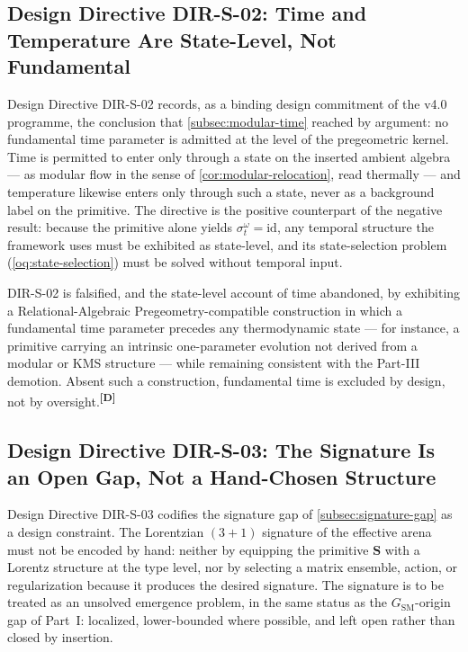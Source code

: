 \documentclass[12pt,a4paper,twoside]{article}
\theoremstyle{plain}
\theoremstyle{definition}
\theoremstyle{remark}
\newcommand{\ProjectShort}{Relational-Algebraic Pregeometry}
\newcommand{\RAP}{\ProjectShort}
\newcommand{\catmark}[1]{\textsuperscript{\textsf{\textbf{[#1]}}}}
\begin{document}
\subsection{Design Directive DIR-S-02: Time and Temperature Are State-Level, Not Fundamental}
\label{subsec:dir-s-02}

Design Directive DIR-S-02 records, as a binding design commitment of the
v4.0 programme, the conclusion that \cref{subsec:modular-time} reached by
argument: no fundamental time parameter is admitted at the level of the
pregeometric kernel. Time is permitted to enter only through a state on the
inserted ambient algebra --- as modular flow in the sense of
\cref{cor:modular-relocation}, read thermally --- and temperature likewise
enters only through such a state, never as a background label on the
primitive. The directive is the positive counterpart of the negative
result: because the primitive alone yields $\sigma^\omega_t=\mathrm{id}$,
any temporal structure the framework uses must be exhibited as state-level,
and its state-selection problem (\cref{oq:state-selection}) must be solved
without temporal input.

\begin{killswitch}
DIR-S-02 is falsified, and the state-level account of time abandoned, by
exhibiting a \RAP-compatible construction in which a fundamental time
parameter precedes any thermodynamic state --- for instance, a primitive
carrying an intrinsic one-parameter evolution not derived from a modular or
KMS structure --- while remaining consistent with the Part-III demotion.
Absent such a construction, fundamental time is excluded by design, not by
oversight.\catmark{D}
\end{killswitch}

\subsection{Design Directive DIR-S-03: The Signature Is an Open Gap, Not a Hand-Chosen Structure}
\label{subsec:dir-s-03}

Design Directive DIR-S-03 codifies the signature gap of
\cref{subsec:signature-gap} as a design constraint. The Lorentzian
$(3{+}1)$ signature of the effective arena must not be encoded by hand:
neither by equipping the primitive $\mathbf S$ with a Lorentz structure at
the type level, nor by selecting a matrix ensemble, action, or
regularization because it produces the desired signature. The signature is
to be treated as an unsolved emergence problem, in the same status as the
$G_{\mathrm{SM}}$-origin gap of Part~I: localized, lower-bounded where
possible, and left open rather than closed by insertion.
\end{document}
